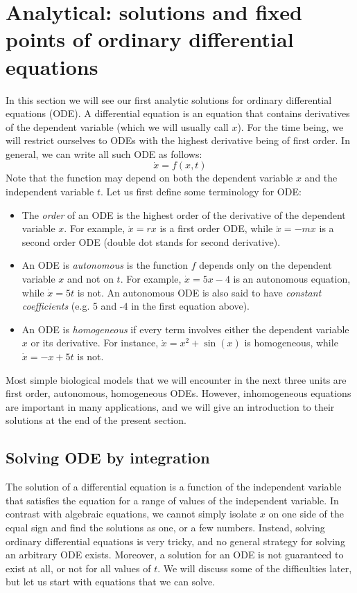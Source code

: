 \documentclass[11pt]{book}
\begin{document}
\section[ODE: solutions, fixed points]{Analytical: solutions and fixed points of ordinary differential equations}
In this section we will see our first analytic solutions for ordinary differential equations (ODE). A differential equation is an equation that contains derivatives of the dependent variable (which we will usually call $x$). For the time being, we will restrict ourselves to ODEs with the highest derivative being of first order. In general, we can write all such ODE as follows:
$$\dot x = f(x,t)$$
Note that the function may depend on both the dependent variable $x$ and the independent variable $t$. Let us first define some terminology for ODE:
\begin{itemize}
\item The \emph{order} of an ODE is the highest order of the derivative of the dependent variable $x$. For example, $\dot x = rx$ is a first order ODE, while $\ddot x = - mx$ is a second order ODE (double dot stands for second derivative).
\item An ODE is  \emph{autonomous} is the function $f$ depends only on the dependent variable $x$ and not on $t$. For example, $\dot x = 5x -4$ is an autonomous equation, while $\dot x = 5t $ is not. An autonomous ODE is also said to have \emph{constant coefficients} (e.g. 5 and -4 in the first equation above).
\item An ODE is \emph{homogeneous} if every term involves either the dependent variable $x$ or its derivative. For instance, $\dot x = x^2 + \sin(x)$ is homogeneous, while $\dot x = -x + 5t$ is not.
\end{itemize}

Most simple biological models that we will encounter in the next three units are first order, autonomous, homogeneous ODEs. However, inhomogeneous equations are important in many applications, and we will give an introduction to their solutions at the end of the present section.

\subsection{Solving ODE by integration}
The solution of a differential equation is a function of the independent variable that satisfies the equation for a range of values of the independent variable. In contrast with algebraic equations, we cannot simply isolate $x$ on one side of the equal sign and find the solutions as one, or a few numbers. Instead, solving ordinary differential equations is very tricky, and no general strategy for solving an arbitrary ODE exists. Moreover, a solution for an ODE is not guaranteed to exist at all, or not for all values of $t$. We will discuss some of the difficulties later, but let us start with equations that we can solve.
\end{document}
